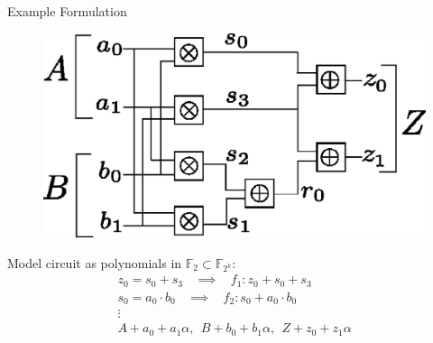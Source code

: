 \documentclass[xcolor=dvipsnames]{beamer}
\begin{document}
\begin{frame}{\large {Example Formulation}}

\begin{figure}[hbt]
\centerline{
\includegraphics[scale=0.4]{2bitmult.eps}
}
\label{fig:mult-2-bit}
\end{figure}

Model circuit as polynomials in $\mathbb{F}_2 \subset \mathbb{F}_{2^k}$:
\begin{eqnarray}
z_0 = s_0 + s_3 ~~~~ \implies ~~~~ f_1: z_0 + s_0 + s_3 \nonumber\\
s_0 = a_0\cdot b_0 ~~~~ \implies ~~~~ f_2: s_0 + a_0\cdot b_0 \nonumber\\
\vdots\nonumber\\
A + a_0 + a_1\alpha, ~~B + b_0 + b_1\alpha, ~~Z + z_0 + z_1\alpha \nonumber
\end{eqnarray}
\end{frame}

\end{document}
